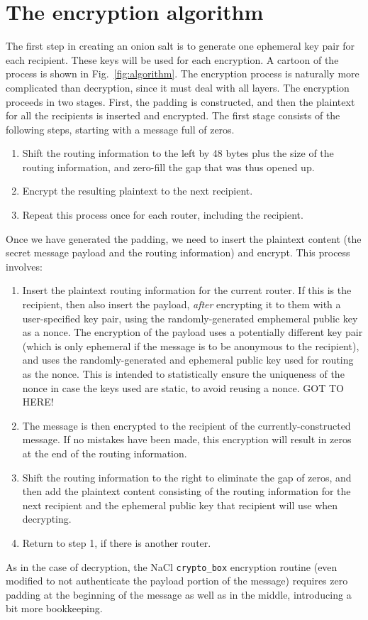 \documentclass[letterpaper,twocolumn,amsmath,amssymb,pre,aps,10pt]{revtex4-1}
\begin{document}
\section{The encryption algorithm}

The first step in creating an onion salt is to generate one ephemeral
key pair for each recipient.  These keys will be used for each
encryption.  A cartoon of the process is shown in
Fig.~\ref{fig:algorithm}.  The encryption process is naturally more
complicated than decryption, since it must deal with all layers.  The
encryption proceeds in two stages.  First, the padding is constructed,
and then the plaintext for all the recipients is inserted and
encrypted.  The first stage consists of the following steps, starting
with a message full of zeros.
\begin{enumerate}
\item Shift the routing information to the left by 48 bytes plus the
  size of the routing information, and zero-fill the gap that was thus
  opened up.
\item Encrypt the resulting plaintext to the next recipient.
\item Repeat this process once for each router, including the
  recipient.
\end{enumerate}
Once we have generated the padding, we need to insert the plaintext
content (the secret message payload and the routing information) and
encrypt.  This process involves:
\begin{enumerate}
\item Insert the plaintext routing information for the current router.
  If this is the recipient, then also insert the payload, \emph{after}
  encrypting it to them with a user-specified key pair, using the
  randomly-generated emphemeral public key as a nonce.  The encryption
  of the payload uses a potentially different key pair (which is only
  ephemeral if the message is to be anonymous to the recipient), and
  uses the randomly-generated and ephemeral public key used for
  routing as the nonce.  This is intended to statistically ensure the
  uniqueness of the nonce in case the keys used are static, to avoid
  reusing a nonce.  GOT TO HERE!
\item The message is then encrypted to the recipient of the
  currently-constructed message.  If no mistakes have been made, this
  encryption will result in zeros at the end of the routing
  information.
\item Shift the routing information to the right to eliminate the gap
  of zeros, and then add the plaintext content consisting of the
  routing information for the next recipient and the ephemeral public
  key that recipient will use when decrypting.
\item Return to step 1, if there is another router.
\end{enumerate}
As in the case of decryption, the NaCl \texttt{crypto\_box} encryption
routine (even modified to not authenticate the payload portion of the
message) requires zero padding at the beginning of the message as well
as in the middle, introducing a bit more bookkeeping.
\end{document}
